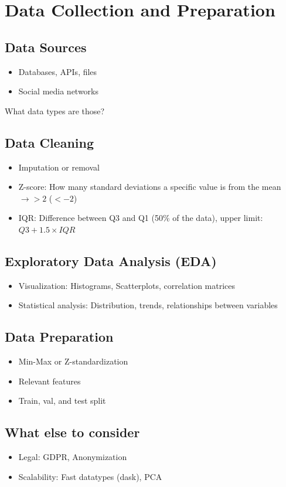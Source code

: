 \documentclass[english]{latex4ei/latex4ei_sheet}
\begin{document}
\section{Data Collection and Preparation}
\begin{sectionbox}
    \subsection{Data Sources}
    \begin{itemize}
        \item Databases, APIs, files
        \item Social media networks
    \end{itemize}
    What data types are those?
    
    \subsection{Data Cleaning}
    \begin{itemize}
        \item Imputation or removal
        \item Z-score: How many standard deviations a specific value is from the mean $\rightarrow > 2$ ($< -2$)
        \item IQR: Difference between Q3 and Q1 (50\% of the data), upper limit: $Q3 + 1.5 \times IQR$
    \end{itemize}
    
    \subsection{Exploratory Data Analysis (EDA)}
    \begin{itemize}
        \item Visualization: Histograms, Scatterplots, correlation matrices
        \item Statistical analysis: Distribution, trends, relationships between variables
    \end{itemize}
    
    \subsection{Data Preparation}
    \begin{itemize}
        \item Min-Max or Z-standardization
        \item Relevant features
        \item Train, val, and test split
    \end{itemize}

    \subsection{What else to consider}
    \begin{itemize}
        \item Legal: GDPR, Anonymization
        \item Scalability: Fast datatypes (dask), PCA
    \end{itemize}
\end{sectionbox}
\end{document}
